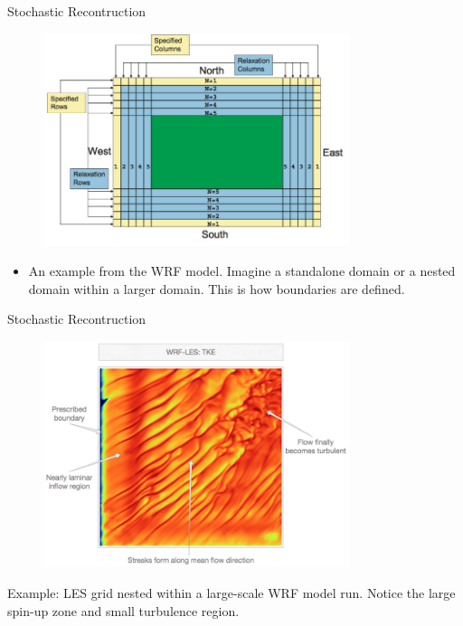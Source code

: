 \begin{frame}{Stochastic Recontruction}
	\begin{figure}
		\includegraphics[width=0.8\textwidth]{inlet6}
	\end{figure}
	\begin{itemize}
	\item An example from the WRF model. Imagine a standalone domain or a nested domain within a larger domain. This is how boundaries are defined.
	\end{itemize}
\end{frame}
\begin{frame}{Stochastic Recontruction}
\begin{figure}
\includegraphics[width=0.8\textwidth]{inlet5}	
\end{figure}
Example: LES grid nested within a large-scale WRF model run. Notice the large spin-up zone and small turbulence region.
\end{frame}
